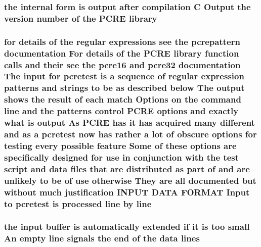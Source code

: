 \subsubsection[{\texorpdfstring{library}{library}}]{\setlength{\rightskip}{0pt plus 5cm}the internal form {\bf is} {\bf output} {\bf after} {\bf compilation} {\bf C} Output the version {\bf number} {\bf of} the {\bf P\+C\+RE} library}\hypertarget{pcretest_8txt_ae2a1af5e67efef701b348c4f654facc6}{}\label{pcretest_8txt_ae2a1af5e67efef701b348c4f654facc6}
\subsubsection[{\texorpdfstring{line}{line}}]{\setlength{\rightskip}{0pt plus 5cm}for {\bf details} {\bf of} the regular {\bf expressions} see the {\bf pcrepattern} {\bf documentation} For {\bf details} {\bf of} the {\bf P\+C\+RE} {\bf library} {\bf function} {\bf calls} and their see the {\bf pcre16} and {\bf pcre32} {\bf documentation} The {\bf input} for {\bf pcretest} {\bf is} {\bf a} {\bf sequence} {\bf of} regular {\bf expression} {\bf patterns} and {\bf strings} {\bf to} {\bf be} {\bf as} described {\bf below} The {\bf output} shows the {\bf result} {\bf of} each {\bf match} Options {\bf on} the {\bf command} line and the {\bf patterns} control {\bf P\+C\+RE} {\bf options} and {\bf exactly} {\bf what} {\bf is} {\bf output} As {\bf P\+C\+RE} has {\bf it} has acquired many different and {\bf as} {\bf a} {\bf pcretest} {\bf now} has rather {\bf a} lot {\bf of} obscure {\bf options} for testing every {\bf possible} {\bf feature} Some {\bf of} these {\bf options} {\bf are} specifically designed for use {\bf in} conjunction {\bf with} the test {\bf script} and {\bf data} {\bf files} that {\bf are} {\bf distributed} {\bf as} part {\bf of} and {\bf are} unlikely {\bf to} {\bf be} {\bf of} use otherwise They {\bf are} {\bf all} documented but without much justification I\+N\+P\+UT {\bf D\+A\+TA} F\+O\+R\+M\+AT Input {\bf to} {\bf pcretest} {\bf is} processed line by line}\hypertarget{pcretest_8txt_aa48192ced95764b23127f24a11803a20}{}\label{pcretest_8txt_aa48192ced95764b23127f24a11803a20}
\subsubsection[{\texorpdfstring{lines}{lines}}]{\setlength{\rightskip}{0pt plus 5cm}the {\bf input} {\bf buffer} {\bf is} automatically extended {\bf if} {\bf it} {\bf is} too small An {\bf empty} {\bf line} signals the {\bf end} {\bf of} the {\bf data} lines}\hypertarget{pcretest_8txt_ad5d1df83a2be84f6f6e9f311890b7729}{}\label{pcretest_8txt_ad5d1df83a2be84f6f6e9f311890b7729}
